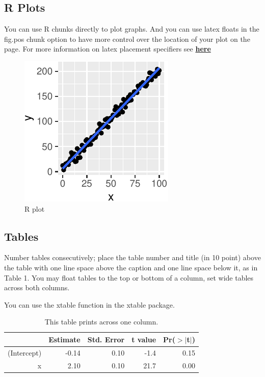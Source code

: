 \documentclass[10pt, letterpaper]{article}
\newenvironment{CodeChunk}{}{}
\begin{document}
\hypertarget{r-plots}{%
\subsection{R Plots}\label{r-plots}}

You can use R chunks directly to plot graphs. And you can use latex
floats in the fig.pos chunk option to have more control over the
location of your plot on the page. For more information on latex
placement specifiers see
\textbf{\href{https://en.wikibooks.org/wiki/LaTeX/Floats,_Figures_and_Captions}{here}}

\begin{CodeChunk}
\begin{figure}[H]

{\centering \includegraphics{figs/plot-1} 

}

\caption[R plot]{R plot}\label{fig:plot}
\end{figure}
\end{CodeChunk}

\hypertarget{tables}{%
\subsection{Tables}\label{tables}}

Number tables consecutively; place the table number and title (in 10
point) above the table with one line space above the caption and one
line space below it, as in Table 1. You may float tables to the top or
bottom of a column, set wide tables across both columns.

You can use the xtable function in the xtable package.

\begin{table}[H]
\centering
\begin{tabular}{rrrrr}
  \hline
 & Estimate & Std. Error & t value & Pr($>$$|$t$|$) \\ 
  \hline
(Intercept) & -0.14 & 0.10 & -1.4 & 0.15 \\ 
  x & 2.10 & 0.10 & 21.7 & 0.00 \\ 
   \hline
\end{tabular}
\caption{This table prints across one column.} 
\end{table}
\end{document}
